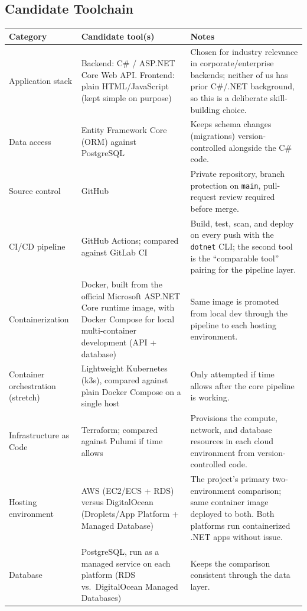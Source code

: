 \subsection{Candidate Toolchain}
\begin{tabularx}{\linewidth}{L{3.0cm}L{3.6cm}Y}
\caption{Candidate DevSecOps Toolchain\label{Table:ToolchainCandidates}}\\
\toprule \textbf{Category} & \textbf{Candidate tool(s)} & \textbf{Notes}\\ \midrule
Application stack & Backend: C\# / ASP.NET Core Web API. Frontend: plain HTML/JavaScript (kept simple on purpose) & Chosen for industry relevance in corporate/enterprise backends; neither of us has prior C\#/.NET background, so this is a deliberate skill-building choice.\\
Data access & Entity Framework Core (ORM) against PostgreSQL & Keeps schema changes (migrations) version-controlled alongside the C\# code.\\
Source control & GitHub & Private repository, branch protection on \texttt{main}, pull-request review required before merge.\\
CI/CD pipeline & GitHub Actions; compared against GitLab CI & Build, test, scan, and deploy on every push with the \texttt{dotnet} CLI; the second tool is the ``comparable tool'' pairing for the pipeline layer.\\
Containerization & Docker, built from the official Microsoft ASP.NET Core runtime image, with Docker Compose for local multi-container development (API + database) & Same image is promoted from local dev through the pipeline to each hosting environment.\\
Container orchestration (stretch) & Lightweight Kubernetes (k3s), compared against plain Docker Compose on a single host & Only attempted if time allows after the core pipeline is working.\\
Infrastructure as Code & Terraform; compared against Pulumi if time allows & Provisions the compute, network, and database resources in each cloud environment from version-controlled code.\\
Hosting environment & AWS (EC2/ECS + RDS) versus DigitalOcean (Droplets/App Platform + Managed Database) & The project's primary two-environment comparison; same container image deployed to both. Both platforms run containerized .NET apps without issue.\\
Database & PostgreSQL, run as a managed service on each platform (RDS vs.\ DigitalOcean Managed Databases) & Keeps the comparison consistent through the data layer.\\

\end{tabularx}
